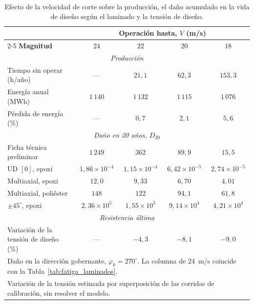 \begin{table}[H]
    \centering
    \caption{Efecto de la velocidad de corte sobre la producción, el daño acumulado en la vida de diseño según el laminado y la tensión de diseño.}
    \label{tab:corte_fatiga}
    \setlength{\tabcolsep}{5pt}
    \begin{tabular}{lcccc}
        \hline
        & \multicolumn{4}{c}{\textbf{Operación hasta}, $V$ (m/s)} \\
        \cline{2-5}
        \textbf{Magnitud} & $24$ & $22$ & $20$ & $18$ \\
        \hline
        \multicolumn{5}{c}{\textit{Producción}} \\
        \hline
        Tiempo sin operar (h/año) & --- & $21{,}1$ & $62{,}3$ & $153{,}3$ \\
        Energía anual (MWh) & $1\,140$ & $1\,132$ & $1\,115$ & $1\,076$ \\
        Pérdida de energía (\%) & --- & $0{,}7$ & $2{,}1$ & $5{,}6$ \\
        \hline
        \multicolumn{5}{c}{\textit{Daño en 20 años, $D_{20}$}} \\
        \hline
        Ficha técnica preliminar & $1\,249$ & $362$ & $89{,}9$ & $15{,}5$ \\
        UD $[0]$, epoxi & $1{,}86 \times 10^{-4}$ & $1{,}15 \times 10^{-4}$ & $6{,}42 \times 10^{-5}$ & $2{,}74 \times 10^{-5}$ \\
        Multiaxial, epoxi & $12{,}0$ & $9{,}33$ & $6{,}70$ & $4{,}01$ \\
        Multiaxial, poliéster & $148$ & $122$ & $94{,}1$ & $61{,}8$ \\
        $\pm 45^\circ$, epoxi & $2{,}36 \times 10^{5}$ & $1{,}55 \times 10^{5}$ & $9{,}14 \times 10^{4}$ & $4{,}21 \times 10^{4}$ \\
        \hline
        \multicolumn{5}{c}{\textit{Resistencia última}} \\
        \hline
        Variación de la tensión de diseño (\%) & --- & $-4{,}3$ & $-8{,}1$ & $-9{,}0$ \\
        \hline
        \multicolumn{5}{l}{\footnotesize Daño en la dirección gobernante, $\varphi_k = 270^\circ$. La columna de $24$~m/s coincide con la Tabla~\ref{tab:fatiga_laminados}.}\\
        \multicolumn{5}{l}{\footnotesize Variación de la tensión estimada por superposición de las corridas de calibración, sin resolver el modelo.}
    \end{tabular}
\end{table}

